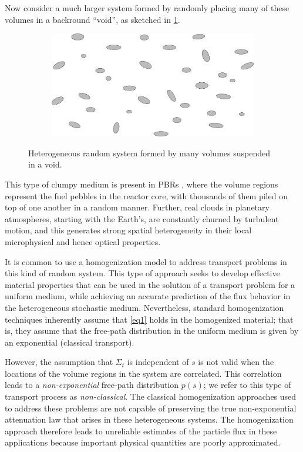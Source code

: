 \documentclass[12pt]{article}
\begin{document}
Now consider a much larger system formed by randomly placing many of these volumes in a backround ``void'', as sketched in \cref{fig2}.
\begin{figure}[hbt]
    \centering
    \begin{subfigure}{0.3\textwidth}
        \centering
        \includegraphics[width=\textwidth]{Fig2a}
    \end{subfigure}
    \caption{Heterogeneous random system formed by many volumes suspended in a void.}
    \label{fig2}
\end{figure}
This type of clumpy medium is present in PBRs \cite{fragre11,vaslar14b}, where the volume regions represent the fuel pebbles in the reactor core, with thousands of them piled on top of one another in a random manner.  Further, real clouds in planetary atmospheres, starting with the Earth's, are constantly churned by turbulent motion, and this generates strong spatial heterogeneity in their local microphysical and hence optical properties.

It is common to use a homogenization model to address transport problems in this kind of random system.
This type of approach seeks to develop effective material properties that can be used in the solution of a transport problem for a uniform medium, while achieving an accurate prediction of the flux behavior in the heterogeneous stochastic medium.
Nevertheless, standard homogenization techniques inherently assume that \cref{eq1} holds in the homogenized material; that is, they assume that the free-path distribution in the uniform medium is given by an exponential (classical transport).

However, the assumption that $\Sigma_t$ is independent of $s$ is not valid when the locations of the volume regions in the system are correlated.
This correlation leads to a \textit{non-exponential} free-path distribution $p(s)$; we refer to this type of transport process as \textit{non-classical}.
The classical homogenization approaches used to address these problems are not capable of preserving the true non-exponential attenuation law that arises in these heterogeneous systems.
The homogenization approach therefore leads to unreliable estimates of the particle flux in these applications because important physical quantities are poorly approximated.
\end{document}
